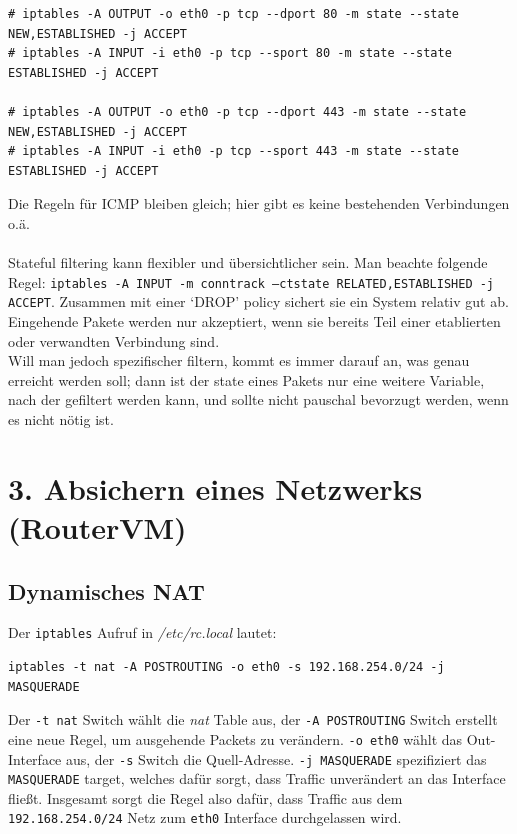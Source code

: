 \documentclass[10pt,a4paper]{article}
\begin{document}
\begin{verbatim}
# iptables -A OUTPUT -o eth0 -p tcp --dport 80 -m state --state NEW,ESTABLISHED -j ACCEPT
# iptables -A INPUT -i eth0 -p tcp --sport 80 -m state --state ESTABLISHED -j ACCEPT

# iptables -A OUTPUT -o eth0 -p tcp --dport 443 -m state --state NEW,ESTABLISHED -j ACCEPT
# iptables -A INPUT -i eth0 -p tcp --sport 443 -m state --state ESTABLISHED -j ACCEPT
\end{verbatim}

Die Regeln für ICMP bleiben gleich; hier gibt es keine bestehenden Verbindungen o.ä.
\\
\\
Stateful filtering kann flexibler und übersichtlicher sein. Man beachte folgende Regel:
\texttt{iptables -A INPUT -m conntrack --ctstate RELATED,ESTABLISHED -j ACCEPT}. Zusammen mit einer `DROP' policy
sichert sie ein System relativ gut ab. Eingehende Pakete werden nur akzeptiert, wenn sie bereits Teil einer etablierten oder verwandten
Verbindung sind.\\
Will man jedoch spezifischer filtern, kommt es immer darauf an, was genau erreicht werden soll; dann ist der state eines Pakets
nur eine weitere Variable, nach der gefiltert werden kann, und sollte nicht pauschal bevorzugt werden, wenn es nicht nötig ist.


\setcounter{section}{3}
\section*{3. Absichern eines Netzwerks (RouterVM)}
\setcounter{subsection}{0}

\subsection{Dynamisches NAT} %

Der \texttt{iptables} Aufruf in \textit{/etc/rc.local} lautet:
\begin{verbatim}
iptables -t nat -A POSTROUTING -o eth0 -s 192.168.254.0/24 -j MASQUERADE
\end{verbatim}
Der \texttt{-t nat} Switch wählt die \textit{nat} Table aus, der \texttt{-A POSTROUTING} Switch erstellt
eine neue Regel, um ausgehende Packets zu verändern. \texttt{-o eth0} wählt das Out-Interface aus, der 
\texttt{-s} Switch die Quell-Adresse. \texttt{-j MASQUERADE} spezifiziert das \texttt{MASQUERADE} target,
welches dafür sorgt, dass Traffic unverändert an das Interface fließt. Insgesamt sorgt die Regel also
dafür, dass Traffic aus dem \texttt{192.168.254.0/24} Netz zum \texttt{eth0} Interface durchgelassen wird.
\end{document}
